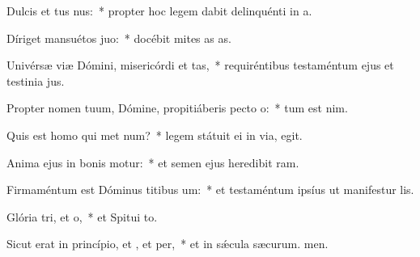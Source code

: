 \item Dulcis et tus nus:~* propter hoc legem dabit delinquénti in a.
\item Díriget mansuétos  juo:~* docébit mites as as.
\item Univérsæ viæ Dómini, misericórdi et tas,~* requiréntibus testaméntum ejus et testinia jus.
\item Propter nomen tuum, Dómine, propitiáberis pecto o:~* tum est nim.
\item Quis est homo qui met num?~* legem státuit ei in via,  egit.
\item Anima ejus in bonis motur:~* et semen ejus heredibit ram.
\item Firmaméntum est Dóminus titibus um:~* et testaméntum ipsíus ut manifestur lis.
\item Glória tri, et o,~* et Spitui to.
\item Sicut erat in princípio, et , et per,~* et in sǽcula sæcurum. men.
